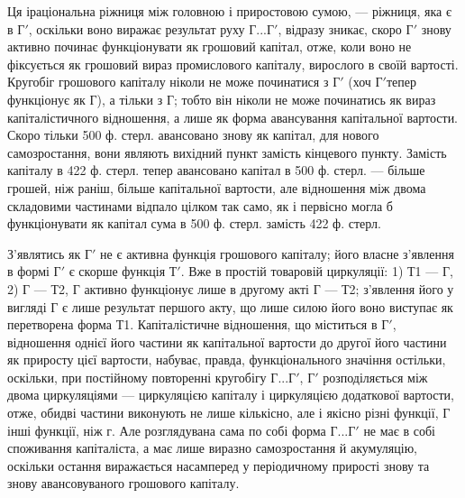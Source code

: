 Ця іраціональна ріжниця між головною і приростовою сумою, — ріжниця,
яка є в $Г'$, оскільки воно виражає результат руху $Г... Г'$, відразу зникає,
скоро $Г'$ знову активно починає функціонувати як грошовий капітал, отже,
коли воно не фіксується як грошовий вираз промислового капіталу, вирослого
в своїй вартості. Кругобіг грошового капіталу ніколи не може
починатися з $Г'$ (хоч $Г' т$епер функціонує як Г), а тільки з Г; тобто
він ніколи не може починатись як вираз капіталістичного відношення, а
лише як форма авансування капітальної вартости. Скоро тільки 500 ф.
стерл. авансовано знову як капітал, для нового самозростання, вони
являють вихідний пункт замість кінцевого пункту. Замість капіталу в
422 ф. стерл. тепер авансовано капітал в 500 ф. стерл. — більше
грошей, ніж раніш, більше капітальної вартости, але відношення між
двома складовими частинами відпало цілком так само, як і первісно
могла б функціонувати як капітал сума в 500 ф. стерл. замість
422 ф. стерл.

З’являтись як $Г'$ не є активна функція грошового капіталу; його
власне з’явлення в формі $Г'$ є скорше функція $Т'$. Вже в простій товаровій
циркуляції: 1) Т1 — Г, 2) Г — Т2, Г активно функціонує лише в
другому акті Г — Т2; з’явлення його у вигляді Г є лише результат першого
акту, що лише силою його воно виступає як перетворена форма
Т1. Капіталістичне відношення, що міститься в $Г'$, відношення однієї його
частини як капітальної вартости до другої його частини як приросту
цієї вартости, набуває, правда, функціонального значіння остільки, оскільки,
при постійному повторенні кругобігу $Г... Г'$, $Г'$ розподіляється між двома
циркуляціями — циркуляцією капіталу і циркуляцією додаткової вартости,
отже, обидві частини виконують не лише кількісно, але і якісно
різні функції, Г інші функції, ніж г. Але розглядувана сама по собі форма
$Г... Г'$ не має в собі споживання капіталіста, а має лише виразно
самозростання й акумуляцію, оскільки остання виражається насамперед
у періодичному прирості знову та знову авансовуваного грошового
капіталу.

